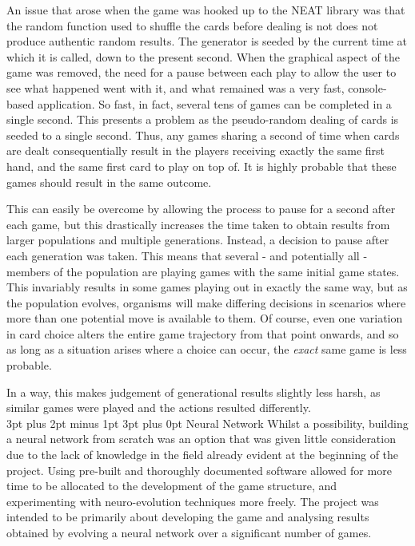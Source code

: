 \documentclass[12pt,a4paper]{article}
\makeatletter
\renewcommand\subsection{\@startsection {subsection}{1}{2mm} %
                               {3pt plus 2pt minus 1pt} %
                               {3pt plus 0pt} %
                               {\normalfont\bfseries}}
\makeatother
\begin{document}
An issue that arose when the game was hooked up to the NEAT library was that the random function used to shuffle the cards before dealing is not does not produce authentic random results. The generator is seeded by the current time at which it is called, down to the present second. When the graphical aspect of the game was removed, the need for a pause between each play to allow the user to see what happened went with it, and what remained was a very fast, console-based application. So fast, in fact, several tens of games can be completed in a single second. This presents a problem as the pseudo-random dealing of cards is seeded to a single second. Thus, any games sharing a second of time when cards are dealt consequentially result in the players receiving exactly the same first hand, and the same first card to play on top of. It is highly probable that these games should result in the same outcome. 

This can easily be overcome by allowing the process to pause for a second after each game, but this drastically increases the time taken to obtain results from larger populations and multiple generations. Instead, a decision to pause after each generation was taken. This means that several - and potentially all - members of the population are playing games with the same initial game states. This invariably results in some games playing out in exactly the same way, but as the population evolves, organisms will make differing decisions in scenarios where more than one potential move is available to them. Of course, even one variation in card choice alters the entire game trajectory from that point onwards, and so as long as a situation arises where a choice can occur, the \textit{exact} same game is less probable. 

In a way, this makes judgement of generational results slightly less harsh, as similar games were played and the actions resulted differently.\\


\subsection{Neural Network}
Whilst a possibility, building a neural network from scratch was an option that was given little consideration due to the lack of knowledge in the field already evident at the beginning of the project. Using pre-built and thoroughly documented software allowed for more time to be allocated to the development of the game structure, and experimenting with neuro-evolution techniques more freely. The project was intended to be primarily about developing the game and analysing results obtained by evolving a neural network over a significant number of games. 
\end{document}
